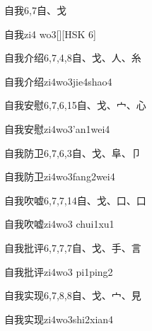 \begin{Entry}{自我}{6,7}{⾃、⼽}
  \begin{Phonetics}{自我}{zi4 wo3}[][HSK 6]
  \end{Phonetics}
\end{Entry}

\begin{Entry}{自我介绍}{6,7,4,8}{⾃、⼽、⼈、⽷}
  \begin{Phonetics}{自我介绍}{zi4wo3jie4shao4}
  \end{Phonetics}
\end{Entry}

\begin{Entry}{自我安慰}{6,7,6,15}{⾃、⼽、⼧、⼼}
  \begin{Phonetics}{自我安慰}{zi4wo3'an1wei4}
  \end{Phonetics}
\end{Entry}

\begin{Entry}{自我防卫}{6,7,6,3}{⾃、⼽、⾩、⼙}
  \begin{Phonetics}{自我防卫}{zi4wo3fang2wei4}
  \end{Phonetics}
\end{Entry}

\begin{Entry}{自我吹嘘}{6,7,7,14}{⾃、⼽、⼝、⼝}
  \begin{Phonetics}{自我吹嘘}{zi4wo3 chui1xu1}
  \end{Phonetics}
\end{Entry}

\begin{Entry}{自我批评}{6,7,7,7}{⾃、⼽、⼿、⾔}
  \begin{Phonetics}{自我批评}{zi4wo3 pi1ping2}
  \end{Phonetics}
\end{Entry}

\begin{Entry}{自我实现}{6,7,8,8}{⾃、⼽、⼧、⾒}
  \begin{Phonetics}{自我实现}{zi4wo3shi2xian4}
  \end{Phonetics}
\end{Entry}

